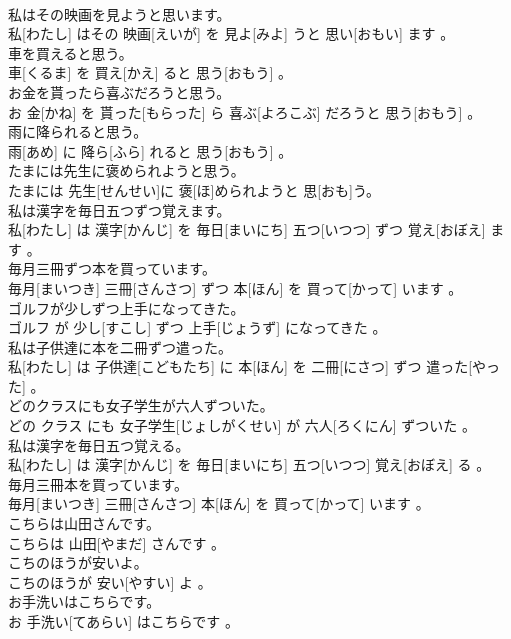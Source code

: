 \documentclass[8pt]{extreport}
\begin{document}
\begin{CJK}{UTF8}{min}
\\	私はその映画を見ようと思います。	
\\	私[わたし] はその 映画[えいが] を 見よ[みよ] うと 思い[おもい] ます 。
\\	車を買えると思う。	
\\	車[くるま] を 買え[かえ] ると 思う[おもう] 。
\\	お金を貰ったら喜ぶだろうと思う。	
\\	お 金[かね] を 貰った[もらった] ら 喜ぶ[よろこぶ] だろうと 思う[おもう] 。
\\	雨に降られると思う。	
\\	雨[あめ] に 降ら[ふら] れると 思う[おもう] 。
\\	たまには先生に褒められようと思う。	
\\	たまには 先生[せんせい]に 褒[ほ]められようと 思[おも]う。
\\	私は漢字を毎日五つずつ覚えます。	
\\	私[わたし] は 漢字[かんじ] を 毎日[まいにち] 五つ[いつつ] ずつ 覚え[おぼえ] ます 。
\\	毎月三冊ずつ本を買っています。	
\\	毎月[まいつき] 三冊[さんさつ] ずつ 本[ほん] を 買って[かって] います 。
\\	ゴルフが少しずつ上手になってきた。	
\\	ゴルフ が 少し[すこし] ずつ 上手[じょうず] になってきた 。
\\	私は子供達に本を二冊ずつ遣った。	
\\	私[わたし] は 子供達[こどもたち] に 本[ほん] を 二冊[にさつ] ずつ 遣った[やった] 。
\\	どのクラスにも女子学生が六人ずついた。	
\\	どの クラス にも 女子学生[じょしがくせい] が 六人[ろくにん] ずついた 。
\\	私は漢字を毎日五つ覚える。	
\\	私[わたし] は 漢字[かんじ] を 毎日[まいにち] 五つ[いつつ] 覚え[おぼえ] る 。
\\	毎月三冊本を買っています。	
\\	毎月[まいつき] 三冊[さんさつ] 本[ほん] を 買って[かって] います 。
\\	こちらは山田さんです。	
\\	こちらは 山田[やまだ] さんです 。
\\	こちのほうが安いよ。	
\\	こちのほうが 安い[やすい] よ 。
\\	お手洗いはこちらです。	
\\	お 手洗い[てあらい] はこちらです 。

\end{CJK}
\end{document}
